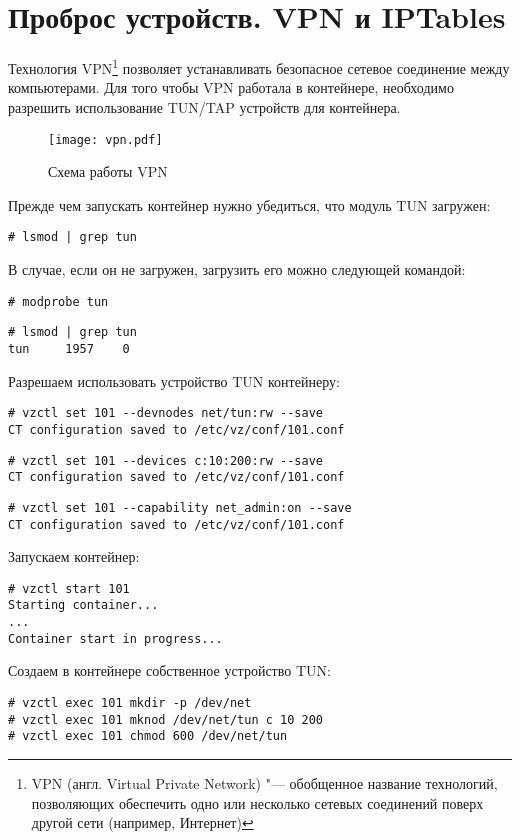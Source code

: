 \section{Проброс устройств. VPN и IPTables}

Технология VPN\footnote{VPN (англ. Virtual Private Network) "--- обобщенное название технологий, позволяющих обеспечить одно или несколько сетевых соединений поверх другой сети (например, Интернет)} позволяет устанавливать безопасное сетевое соединение между компьютерами.
Для того чтобы VPN работала в контейнере, необходимо разрешить использование TUN/TAP устройств для контейнера.
\begin{figure}[ht]
    \centering
	\texttt{[image: vpn.pdf]}
	\caption{Схема работы VPN}\label{pic:vpn}
\end{figure}

Прежде чем запускать контейнер нужно убедиться, что модуль TUN загружен:
\begin{lstlisting}
# lsmod | grep tun
\end{lstlisting}

В случае, если он не загружен, загрузить его можно следующей командой:
\begin{lstlisting}
# modprobe tun
\end{lstlisting}
\begin{lstlisting}
# lsmod | grep tun
tun     1957    0
\end{lstlisting}

Разрешаем использовать устройство TUN контейнеру:
\begin{lstlisting}
# vzctl set 101 --devnodes net/tun:rw --save
CT configuration saved to /etc/vz/conf/101.conf
\end{lstlisting}
\begin{lstlisting}
# vzctl set 101 --devices c:10:200:rw --save
CT configuration saved to /etc/vz/conf/101.conf
\end{lstlisting}
\begin{lstlisting}
# vzctl set 101 --capability net_admin:on --save
CT configuration saved to /etc/vz/conf/101.conf
\end{lstlisting}

Запускаем контейнер:
\begin{lstlisting}
# vzctl start 101
Starting container...
...
Container start in progress...
\end{lstlisting}

Создаем в контейнере собственное устройство TUN:
\begin{lstlisting}
# vzctl exec 101 mkdir -p /dev/net
# vzctl exec 101 mknod /dev/net/tun c 10 200
# vzctl exec 101 chmod 600 /dev/net/tun
\end{lstlisting}

